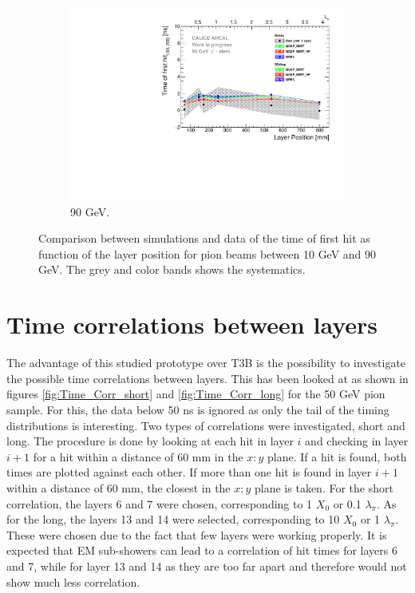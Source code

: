 \begin{figure}[htbp!]
\begin{subfigure}[t]{0.5\textwidth}
		\includegraphics[width=1\textwidth]{../Thesis_Plots/Timing/Pions/Plots/ComparisonToSim/Time_Depth_90GeV.pdf}
		\caption{90 GeV.} \label{fig:Depth_SimData_90GeV}
	\end{subfigure}
	\caption{Comparison between simulations and data of the time of first hit as function of the layer position for pion beams between 10 GeV and 90 GeV. The grey and color bands shows the systematics.}
	\label{fig:Depth_SimData_Comparison}
\end{figure}

\section{Time correlations between layers}

The advantage of this studied prototype over T3B is the possibility to investigate the possible time correlations between layers. This has been looked at as shown in figures \ref{fig:Time_Corr_short} and \ref{fig:Time_Corr_long} for the 50 GeV pion sample. For this, the data below 50 ns is ignored as only the tail of the timing distributions is interesting. Two types of correlations were investigated, short and long. The procedure is done by looking at each hit in layer $i$ and checking in layer $i+1$ for a hit within a distance of 60 mm in the $x:y$ plane. If a hit is found, both times are plotted against each other. If more than one hit is found in layer $i+1$ within a distance of 60 mm, the closest in the $x:y$ plane is taken. For the short correlation, the layers 6 and 7 were chosen, corresponding to 1 $X_0$ or 0.1 $\lambda_{\pi}$. As for the long, the layers 13 and 14 were selected, corresponding to 10 $X_0$ or 1 $\lambda_{\pi}$. These were chosen due to the fact that few layers were working properly. It is expected that EM sub-showers can lead to a correlation of hit times for layers 6 and 7, while for layer 13 and 14 as they are too far apart and therefore would not show much less correlation.


